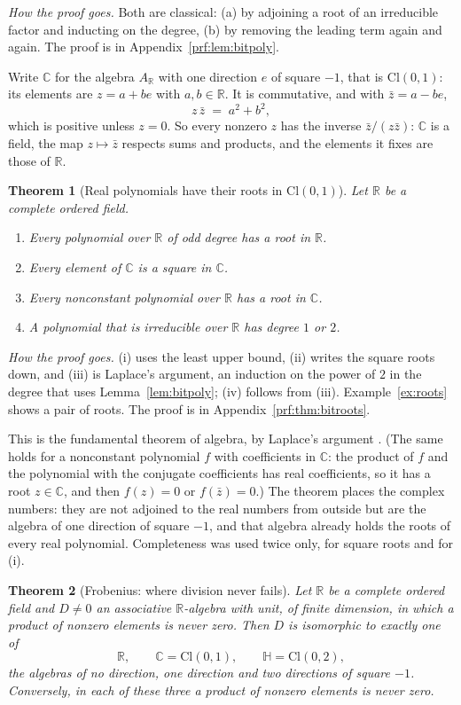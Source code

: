 \documentclass[11pt]{article}
\theoremstyle{plain}
\newtheorem{theorem}{Theorem}[section]
\theoremstyle{definition}
\theoremstyle{plain}
\theoremstyle{definition}
\newcommand{\Cl}{\mathrm{Cl}}
\newcommand{\R}{\mathbb{R}}
\newcommand{\C}{\mathbb{C}}
\newcommand{\HH}{\mathbb{H}}
\begin{document}
\noindent\emph{How the proof goes.} Both are classical: (a) by adjoining a root of an irreducible factor and inducting on the degree, (b) by removing the leading term again and again. The proof is in Appendix~\ref{prf:lem:bitpoly}.

Write $\C$ for the algebra $A_{\R}$ with one direction $e$ of square $-1$, that is $\Cl(0,1)$: its elements are $z = a + be$ with $a, b \in \R$. It is commutative, and with $\bar{z} = a - be$,
\[
z\,\bar{z} \;=\; a^{2} + b^{2} ,
\]
which is positive unless $z = 0$. So every nonzero $z$ has the inverse $\bar{z}/(z\bar{z})$: $\C$ is a field, the map $z \mapsto \bar{z}$ respects sums and products, and the elements it fixes are those of $\R$.

\begin{theorem}[Real polynomials have their roots in $\Cl(0,1)$]\label{thm:bitroots}
Let $\R$ be a complete ordered field.
\begin{enumerate}
\item[(i)] Every polynomial over $\R$ of odd degree has a root in $\R$.
\item[(ii)] Every element of $\C$ is a square in $\C$.
\item[(iii)] Every nonconstant polynomial over $\R$ has a root in $\C$.
\item[(iv)] A polynomial that is irreducible over $\R$ has degree $1$ or $2$.
\end{enumerate}
\end{theorem}

\noindent\emph{How the proof goes.} (i) uses the least upper bound, (ii) writes the square roots down, and (iii) is Laplace's argument, an induction on the power of $2$ in the degree that uses Lemma~\ref{lem:bitpoly}; (iv) follows from (iii). Example~\ref{ex:roots} shows a pair of roots. The proof is in Appendix~\ref{prf:thm:bitroots}.

This is the fundamental theorem of algebra, by Laplace's argument \cite{Ebbinghaus1991}. (The same holds for a nonconstant polynomial $f$ with coefficients in $\C$: the product of $f$ and the polynomial with the conjugate coefficients has real coefficients, so it has a root $z \in \C$, and then $f(z) = 0$ or $f(\bar{z}) = 0$.) The theorem places the complex numbers: they are not adjoined to the real numbers from outside but are the algebra of one direction of square $-1$, and that algebra already holds the roots of every real polynomial. Completeness was used twice only, for square roots and for (i).

\begin{theorem}[Frobenius: where division never fails]\label{thm:bitfrobenius}
Let $\R$ be a complete ordered field and $D \neq 0$ an associative $\R$-algebra with unit, of finite dimension, in which a product of nonzero elements is never zero. Then $D$ is isomorphic to exactly one of
\[
\R, \qquad \C = \Cl(0,1), \qquad \HH = \Cl(0,2) ,
\]
the algebras of no direction, one direction and two directions of square $-1$.
Conversely, in each of these three a product of nonzero elements is never zero.
\end{theorem}
\end{document}
